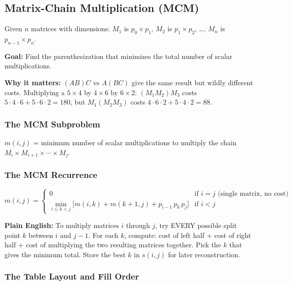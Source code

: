 \documentclass[12pt,portrait]{article}
\begin{document}
\subsection{Matrix-Chain Multiplication (MCM)}
\label{sec:mcm}

\begin{rulebox}
Given $n$ matrices with dimensions: $M_1$ is $p_0 \times p_1$, $M_2$ is $p_1 \times p_2$, \ldots, $M_n$ is $p_{n-1} \times p_n$.

\textbf{Goal:} Find the parenthesization that minimizes the total number of scalar multiplications.

\textbf{Why it matters:} $(AB)C$ vs $A(BC)$ give the same result but wildly different costs. Multiplying a $5\times4$ by $4\times6$ by $6\times2$: $(M_1M_2)M_3$ costs $5\cdot4\cdot6 + 5\cdot6\cdot2 = 180$, but $M_1(M_2M_3)$ costs $4\cdot6\cdot2 + 5\cdot4\cdot2 = 88$.
\end{rulebox}

\subsubsection{The MCM Subproblem}

$m(i,j)$ = minimum number of scalar multiplications to multiply the chain $M_i \times M_{i+1} \times \cdots \times M_j$.

\subsubsection{The MCM Recurrence}

$$m(i,j) = \begin{cases}
0 & \text{if } i = j \text{ (single matrix, no cost)} \\[6pt]
\displaystyle\min_{i \leq k < j} \Big[ m(i,k) + m(k+1,j) + p_{i-1}\,p_k\,p_j \Big] & \text{if } i < j
\end{cases}$$

\textbf{Plain English:} To multiply matrices $i$ through $j$, try EVERY possible split point $k$ between $i$ and $j-1$. For each $k$, compute: cost of left half + cost of right half + cost of multiplying the two resulting matrices together. Pick the $k$ that gives the minimum total. Store the best $k$ in $s(i,j)$ for later reconstruction.

\subsubsection{The Table Layout and Fill Order}
\end{document}

